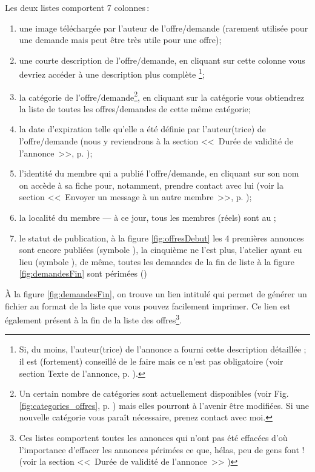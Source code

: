 Les deux listes comportent 7 colonnes\,:
\begin{enumerate}
    \item une image téléchargée par l’auteur de l’offre/demande (rarement utilisée pour une demande mais peut être très utile pour une offre);
    \item une courte description de l'offre/demande, en cliquant sur cette colonne vous devriez accéder à une description plus complète%
    \footnote{Si, du moins, l'auteur(trice) de l'annonce a fourni cette description détaillée ; il est (fortement) conseillé de le faire mais ce n'est pas obligatoire (voir section \og{}Texte de l'annonce\fg, p. \pageref{sec:texteAnnonce}).};
    \item la catégorie de l'offre/demande\footnote{Un certain nombre de catégories sont actuellement disponibles (voir Fig. \ref{fig:categories_offres}, p. \pageref{fig:categories_offres}) mais elles pourront à l’avenir être modifiées. Si une nouvelle catégorie vous paraît nécessaire, prenez contact avec moi.}, en cliquant sur la catégorie vous obtiendrez la liste de toutes les offres/demandes de cette même catégorie;
    \item la date d’expiration telle qu’elle a été définie par l’auteur(trice) de l’offre/demande (nous y reviendrons à la section <<~Durée de validité de l’annonce~>>, p. \pageref{sec:dureeValiditeAnnonce});
    \item l’identité du membre qui a publié l’offre/demande, en cliquant sur son nom on accède à sa fiche pour, notamment, prendre contact avec lui (voir la section <<~Envoyer un message à un autre membre~>>, p. \pageref{page:envoyerCourrielMembre});
    \item la localité du membre --- à ce jour, tous les membres (réels) sont au \CdS;
    \item le statut de publication, à la figure \ref{fig:offresDebut} les 4 premières annonces sont encore publiées (symbole ), la cinquième ne l’est plus, l’atelier ayant eu lieu (symbole ), de même, toutes les demandes de la fin de liste à la figure \ref{fig:demandesFin} sont périmées ()
\end{enumerate}

À la figure \ref{fig:demandesFin}, on trouve un lien intitulé  qui permet de générer un fichier au format  de la liste que vous pouvez facilement imprimer. Ce lien est également présent à la fin de la liste des offres\footnote{Ces listes comportent toutes les annonces qui n'ont pas été effacées d'où l'importance d'effacer les annonces périmées ce que, hélas, peu de gens font ! (voir la section <<~Durée de validité de l'annonce~>> )}.

